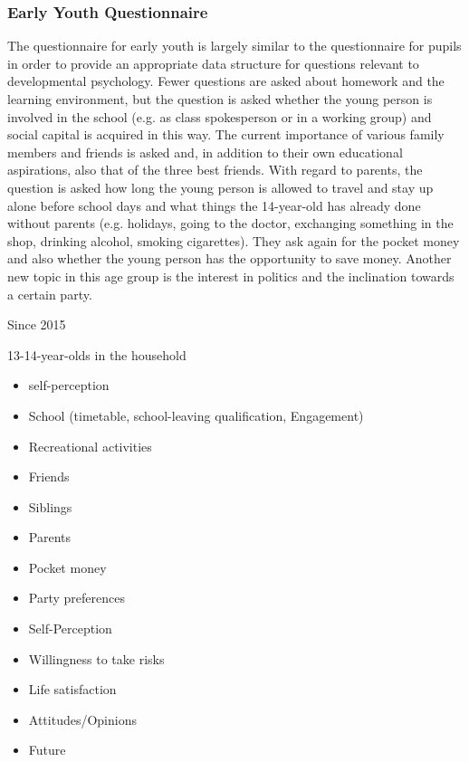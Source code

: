 \documentclass[letterpaper,10pt,openany,onesideH,english]{sphinxmanual}
\begin{document}
\subsubsection{Early Youth Questionnaire}
\label{\detokenize{Contents of SOEPcore/index:early-youth-questionnaire}}\label{\detokenize{Contents of SOEPcore/index:id26}}
The questionnaire for early youth is largely similar to the questionnaire for pupils in order to provide an appropriate data structure for questions relevant to developmental psychology. Fewer questions are asked about homework and the learning environment, but the question is asked whether the young person is involved in the school (e.g. as class spokesperson or in a working group) and social capital is acquired in this way. The current importance of various family members and friends is asked and, in addition to their own educational aspirations, also that of the three best friends. With regard to parents, the question is asked how long the young person is allowed to travel and stay up alone before school days and what things the 14-year-old has already done without parents (e.g. holidays, going to the doctor, exchanging something in the shop, drinking alcohol, smoking cigarettes). They ask again for the pocket money and also whether the young person has the opportunity to save money. Another new topic in this age group is the interest in politics and the inclination towards a certain party.

 Since 2015

 13-14-year-olds in the household

\begin{itemize}
\item {} 
self-perception

\item {} 
School (timetable, school-leaving qualification, Engagement)

\item {} 
Recreational activities

\item {} 
Friends

\item {} 
Siblings

\item {} 
Parents

\item {} 
Pocket money

\item {} 
Party preferences

\item {} 
Self-Perception

\item {} 
Willingness to take risks

\item {} 
Life satisfaction

\item {} 
Attitudes/Opinions

\item {} 
Future

\end{itemize}
\end{document}
